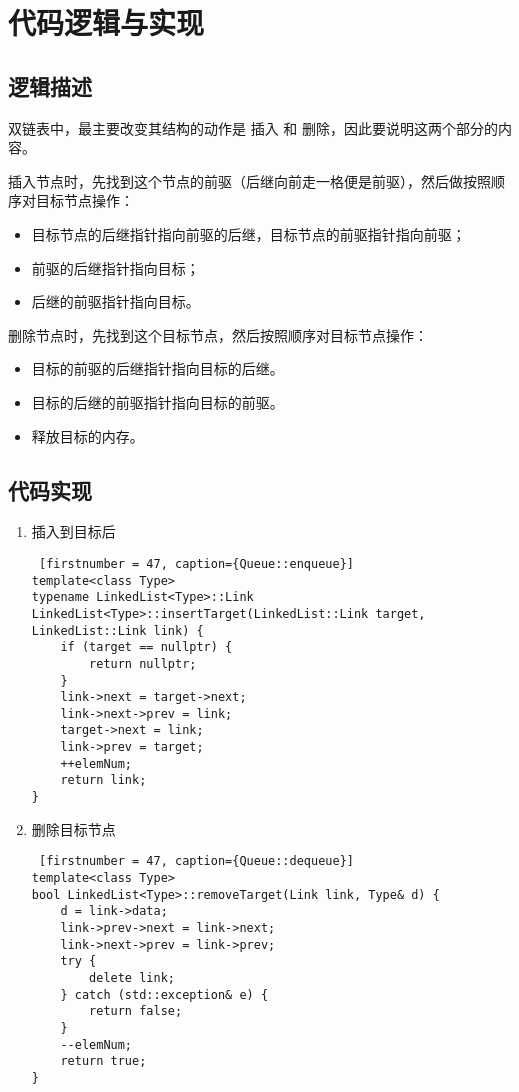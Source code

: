 \section{代码逻辑与实现}

\subsection{逻辑描述}


双链表中，最主要改变其结构的动作是 {\kaishu 插入} 和 {\kaishu 删除}，因此要说明这两个部分的内容。

插入节点时，先找到这个节点的前驱（后继向前走一格便是前驱），然后做按照顺序对目标节点操作：

\begin{itemize}
    \item 目标节点的后继指针指向前驱的后继，目标节点的前驱指针指向前驱；
    \item 前驱的后继指针指向目标；
    \item 后继的前驱指针指向目标。
\end{itemize}

删除节点时，先找到这个目标节点，然后按照顺序对目标节点操作：
\begin{itemize}
    \item 目标的前驱的后继指针指向目标的后继。
    \item 目标的后继的前驱指针指向目标的前驱。
    \item 释放目标的内存。
\end{itemize}


\subsection{代码实现}

{
\begin{enumerate}
      \item 插入到目标后
\begin{lstlisting} [firstnumber = 47, caption={Queue::enqueue}]
template<class Type>
typename LinkedList<Type>::Link
LinkedList<Type>::insertTarget(LinkedList::Link target, LinkedList::Link link) {
    if (target == nullptr) {
        return nullptr;
    }
    link->next = target->next;
    link->next->prev = link;
    target->next = link;
    link->prev = target;
    ++elemNum;
    return link;
} \end{lstlisting}
      \item 删除目标节点
\begin{lstlisting} [firstnumber = 47, caption={Queue::dequeue}]
template<class Type>
bool LinkedList<Type>::removeTarget(Link link, Type& d) {
    d = link->data;
    link->prev->next = link->next;
    link->next->prev = link->prev;
    try {
        delete link;
    } catch (std::exception& e) {
        return false;
    }
    --elemNum;
    return true;
}\end{lstlisting}
      
\end{enumerate}
}

